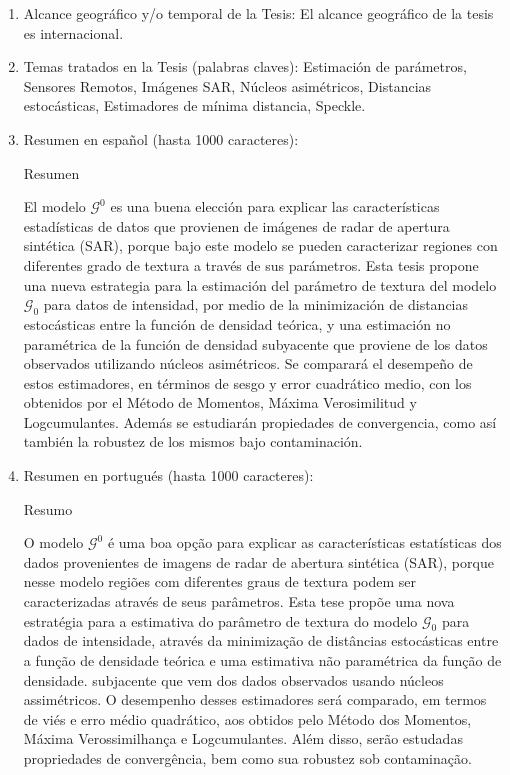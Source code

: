 \begin{enumerate}
	\item Alcance geográfico y/o temporal de la Tesis: El alcance geográfico de la tesis es internacional.
	
	\item Temas tratados en la Tesis (palabras claves): Estimación de parámetros, Sensores Remotos, Imágenes SAR, Núcleos asimétricos, Distancias estocásticas, Estimadores de mínima distancia, Speckle.
	
	\item Resumen en español (hasta 1000 caracteres): 
	
	Resumen
	
	El modelo $\mathcal{G}^0$ es una buena elección para explicar las características estadísticas de datos que provienen de imágenes de radar de apertura sintética (SAR), porque bajo este modelo se pueden caracterizar regiones con diferentes grado de textura a través de sus parámetros.  Esta tesis propone una nueva estrategia para la estimación del parámetro de textura del modelo $\mathcal G_0$ para datos de intensidad, por medio de la minimización de distancias estocásticas entre la función de densidad teórica, y una estimación no paramétrica de la función de densidad subyacente que proviene de los datos observados utilizando núcleos asimétricos. Se comparará el desempeño de estos estimadores, en términos de sesgo y error cuadrático medio, con los obtenidos por el Método de Momentos, Máxima Verosimilitud y Logcumulantes. Además se estudiarán propiedades de convergencia, como así también la robustez de los mismos bajo contaminación. 
	
	
	\item Resumen en portugués (hasta 1000 caracteres):
	
	Resumo
	
	O modelo $ \mathcal {G}^0$ é uma boa opção para explicar as características estatísticas dos dados provenientes de imagens de radar de abertura sintética (SAR), porque nesse modelo regiões com diferentes graus de textura podem ser caracterizadas através de seus parâmetros. Esta tese propõe uma nova estratégia para a estimativa do parâmetro de textura do modelo $\mathcal{G}_0$ para dados de intensidade, através da minimização de distâncias estocásticas entre a função de densidade teórica e uma estimativa não paramétrica da função de densidade. subjacente que vem dos dados observados usando núcleos assimétricos. O desempenho desses estimadores será comparado, em termos de viés e erro médio quadrático, aos obtidos pelo Método dos Momentos, Máxima Verossimilhança e Logcumulantes. Além disso, serão estudadas propriedades de convergência, bem como sua robustez sob contaminação.
	

\end{enumerate}
